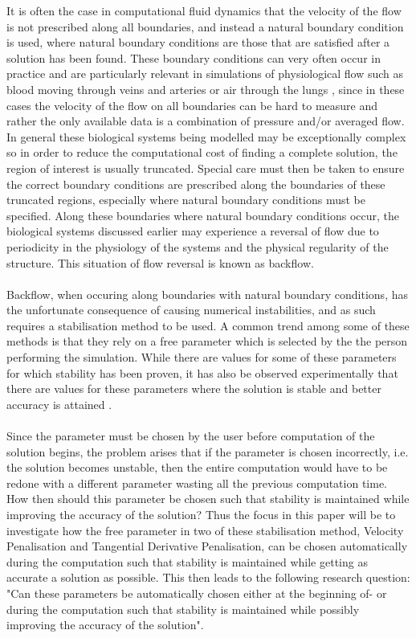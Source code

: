 

It is often the case in computational fluid dynamics that the velocity of the flow is not prescribed along all boundaries, and instead a natural boundary condition is used, where natural boundary conditions are those that are satisfied after a solution has been found. These boundary conditions can very often occur in practice and are particularly relevant in simulations of physiological flow such as blood moving through veins and arteries or air through the lungs \cite{bertoglio2017}, since in these cases the velocity of the flow on all boundaries can be hard to measure and rather the only available data is a combination of pressure and/or averaged flow. In general these biological systems being modelled may be exceptionally complex so in order to reduce the computational cost of finding a complete solution, the region of interest is usually truncated. Special care must then be taken to ensure the correct boundary conditions are prescribed along the boundaries of these truncated regions, especially where natural boundary conditions must be specified. Along these boundaries where natural boundary conditions occur, the biological systems discussed earlier may experience a reversal of flow due to periodicity in the physiology of the systems and the physical regularity of the structure. This situation of flow reversal is known as backflow.
\\
\\
Backflow, when occuring along boundaries with natural boundary conditions, has the unfortunate consequence of causing numerical instabilities, and as such requires a stabilisation method to be used. A common trend among some of these methods is that they rely on a free parameter which is selected by the the person performing the simulation. While there are values for some of these parameters for which stability has been proven, it has also be observed experimentally that there are values for these parameters where the solution is stable and better accuracy is attained \cite{bertoglio2014}.\\
\\
Since the parameter must be chosen by the user before computation of the solution begins, the problem arises that if the parameter is chosen incorrectly, i.e. the solution becomes unstable, then the entire computation would have to be redone with a different parameter wasting all the previous computation time. How then should this parameter be chosen such that stability is maintained while improving the accuracy of the solution? Thus the focus in this paper will be to investigate how the free parameter in two of these stabilisation method, Velocity Penalisation and Tangential Derivative Penalisation, can be chosen automatically during the computation such that stability is maintained while getting as accurate a solution as possible. This then leads to the following research question: "Can these parameters be automatically chosen either at the beginning of- or during the computation such that stability is maintained while possibly improving the accuracy of the solution".\\
